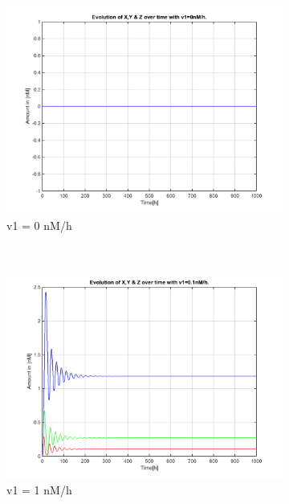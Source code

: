 \documentclass[10pt,a4paper,oneside,twocolumn]{article}
\numberwithin{equation}{section} %
\begin{document}
    \begin{figure}
    \centering
	\begin{subfigure}[b]{0.3\textwidth}
	    \includegraphics[width=\textwidth]{LotsofthesameA/A-A0.png}
	    \caption{v1 = 0 nM/h}
	\end{subfigure}
	~ 
	\begin{subfigure}[b]{0.3\textwidth}
	    \includegraphics[width=\textwidth]{LotsofthesameA/A-A1.png}
	    \caption{v1 = 1 nM/h}
	\end{subfigure}
	~ 
	\begin{subfigure}[b]{0.3\textwidth}

\end{subfigure}
\end{figure}
\end{document}
